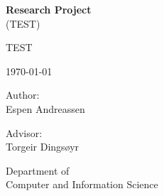 \documentclass[12pt,a4paper,oneside]{report}
\begin{document}

\thispagestyle{empty}

\begin{center}
    {\Huge\textbf{Research Project}} \\
    \medskip
    {\huge (TEST)}

    \vspace{.5cm}

    {\Large
    TEST}\\

    \vspace{0.5cm}

    {\large \today}\\

    \vspace{0.5cm}

    {\Large Author:}\\
    {\large
    Espen Andreassen\\
    }

    \vspace{0.5cm}

    {\large
    Advisor:\\
    Torgeir Dingsøyr\\}

    \vspace{1cm}



    \large{Department of\\Computer and Information Science}

\end{center}

\newpage




\setcounter{tocdepth}{1}
\dominitoc
\dominilof
\dominilot
\tableofcontents
\clearpage
\listoffigures
\listoftables









\end{document}
